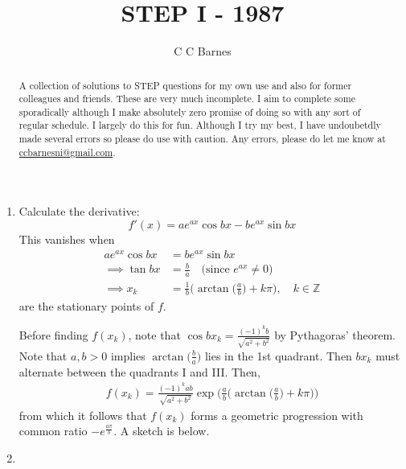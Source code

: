 \documentclass{article}
\title{STEP I - 1987}
\author{C C Barnes}
\begin{document}
\maketitle

\begin{abstract}
	A collection of solutions to STEP questions for my own use and also for former colleagues and friends. These are very much incomplete. I aim to complete some sporadically although I make absolutely zero promise of doing so with any sort of regular schedule. I largely do this for fun. Although I try my best, I have undoubetdly made several errors so please do use with caution. Any errors, please do let me know at \url{ccbarnesni@gmail.com}.
\end{abstract}

\newpage

\begin{enumerate}
    \item Calculate the derivative:
    \[
    f'(x) = ae^{ax}\cos{bx} - be^{ax}\sin{bx}
    \]
    This vanishes when
    \begin{align*}
        ae^{ax}\cos{bx} &= be^{ax}\sin{bx} \\
        \implies \tan{bx} &= \frac{b}{a} \quad \text{(since } e^{ax}\neq0 \text{)} \\
        \implies x_k &= \frac{1}{b}\Big(\arctan{\Big(\frac{a}{b}\Big)} + k\pi\Big), \quad k \in \mathbb{Z}
    \end{align*}
    are the stationary points of \(f\).

    Before finding \(f(x_k)\), note that \(\cos{bx_k} = \frac{(-1)^kb}{\sqrt{a^2+b^2}}\) by Pythagoras' theorem. Note that \(a,b>0\) implies \(\arctan\Big(\frac{b}{a}\Big)\) lies in the 1st quadrant. Then \(bx_k\) must alternate between the quadrants I and III. Then,
    \begin{align*}
        f(x_k) = \frac{(-1)^kab}{\sqrt{a^2+b^2}}\exp\Big(\frac{a}{b}\Big(\arctan{\Big(\frac{a}{b}\Big)} + k\pi\Big)\Big)
    \end{align*}
    from which it follows that \(f(x_k)\) forms a geometric progression with common ratio \(-e^{\frac{a\pi}{b}}\). A sketch is below.

    \item 


\end{enumerate}
\end{document}
